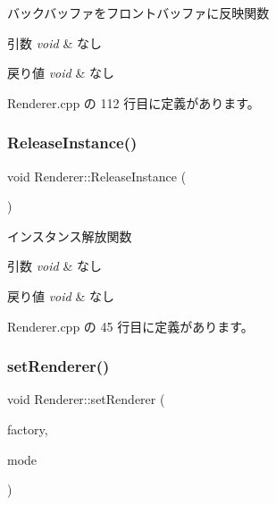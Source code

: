 バックバッファをフロントバッファに反映関数 


\begin{DoxyParams}{引数}
{\em void} & なし \\
\hline
\end{DoxyParams}

\begin{DoxyRetVals}{戻り値}
{\em void} & なし \\
\hline
\end{DoxyRetVals}


 Renderer.\+cpp の 112 行目に定義があります。

\mbox{\label{class_renderer_aa7ac523172faaf376ecddaed4bdc0781}} 
\subsubsection{\texorpdfstring{Release\+Instance()}{ReleaseInstance()}}
{\footnotesize\ttfamily void Renderer\+::\+Release\+Instance (\begin{DoxyParamCaption}{ }\end{DoxyParamCaption})\hspace{0.3cm}{\ttfamily [static]}}



インスタンス解放関数 


\begin{DoxyParams}{引数}
{\em void} & なし \\
\hline
\end{DoxyParams}

\begin{DoxyRetVals}{戻り値}
{\em void} & なし \\
\hline
\end{DoxyRetVals}


 Renderer.\+cpp の 45 行目に定義があります。

\mbox{\label{class_renderer_a02e3c483b2c9d8024e51639a06159066}} 
\subsubsection{\texorpdfstring{set\+Renderer()}{setRenderer()}}
{\footnotesize\ttfamily void Renderer\+::set\+Renderer (\begin{DoxyParamCaption}\item[{\mbox{\hyperlink{class_renderer_factory_interface}{Renderer\+Factory\+Interface}} $\ast$}]{factory,  }\item[{\mbox{\hyperlink{class_renderer_ab5a9379ccadcf2b3394c61cf8c835fec}{M\+O\+DE}}}]{mode }\end{DoxyParamCaption})}



